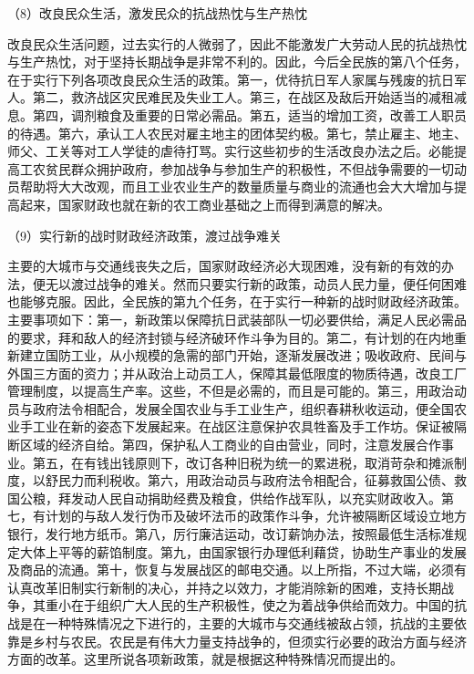 \documentclass[UTF8, 12pt, a4paper]{ctexrep}
\begin{document}
（8）改良民众生活，激发民众的抗战热忱与生产热忱

改良民众生活问题，过去实行的人微弱了，因此不能激发广大劳动人民的抗战热忱与生产热忱，对于坚持长期战争是非常不利的。因此，今后全民族的第八个任务，在于实行下列各项改良民众生活的政策。第一，优待抗日军人家属与残废的抗日军人。第二，救济战区灾民难民及失业工人。第三，在战区及敌后开始适当的减租减息。第四，调剂粮食及重要的日常必需品。第五，适当的增加工资，改善工人职员的待遇。第六，承认工人农民对雇主地主的团体契约极。第七，禁止雇主、地主、师父、工关等对工人学徒的虐待打骂。实行这些初步的生活改良办法之后。必能提高工农贫民群众拥护政府，参加战争与参加生产的积极性，不但战争需要的一切动员帮助将大大改观，而且工业农业生产的数量质量与商业的流通也会大大增加与提高起来，国家财政也就在新的农工商业基础之上而得到满意的解决。

（9）实行新的战时财政经济政策，渡过战争难关

主要的大城市与交通线丧失之后，国家财政经济必大现困难，没有新的有效的办法，便无以渡过战争的难关。然而只要实行新的政策，动员人民力量，便任何困难也能够克服。因此，全民族的第九个任务，在于实行一种新的战时财政经济政策。主要事项如下：第一，新政策以保障抗日武装部队一切必要供给，满足人民必需品的要求，拜和敌人的经济封锁与经济破环作斗争为目的。第二，有计划的在内地重新建立国防工业，从小规模的急需的部门开始，逐渐发展改进；吸收政府、民间与外国三方面的资力；并从政治上动员工人，保障其最低限度的物质待遇，改良工厂管理制度，以提高生产率。这些，不但是必需的，而且是可能的。第三，用政治动员与政府法令相配合，发展全国农业与手工业生产，组织春耕秋收运动，便全国农业手工业在新的姿态下发展起来。在战区注意保护农具牲畜及手工作坊。保证被隔断区域的经济自给。第四，保护私人工商业的自由营业，同时，注意发展合作事业。第五，在有钱出钱原则下，改订各种旧税为统一的累进税，取消苛杂和摊派制度，以舒民力而利税收。第六，用政治动员与政府法令相配合，征募救国公债、救国公粮，拜发动人民自动捐助经费及粮食，供给作战军队，以充实财政收入。第七，有计划的与敌人发行伪币及破坏法币的政策作斗争，允许被隔断区域设立地方银行，发行地方纸币。第八，厉行廉洁运动，改订薪饷办法，按照最低生活标准规定大体上平等的薪馅制度。第九，由国家银行办理低利藉贷，协助生产事业的发展及商品的流通。第十，恢复与发展战区的邮电交通。以上所指，不过大端，必须有认真改革旧制实行新制的决心，并持之以效力，才能消除新的困难，支持长期战争，其重小在于组织广大人民的生产积极性，使之为着战争供给而效力。中国的抗战是在一种特殊情况之下进行的，主要的大城市与交通线被敌占领，抗战的主要依靠是乡村与农民。农民是有伟大力量支持战争的，但须实行必要的政治方面与经济方面的改革。这里所说各项新政策，就是根据这种特殊情况而提出的。
\end{document}

